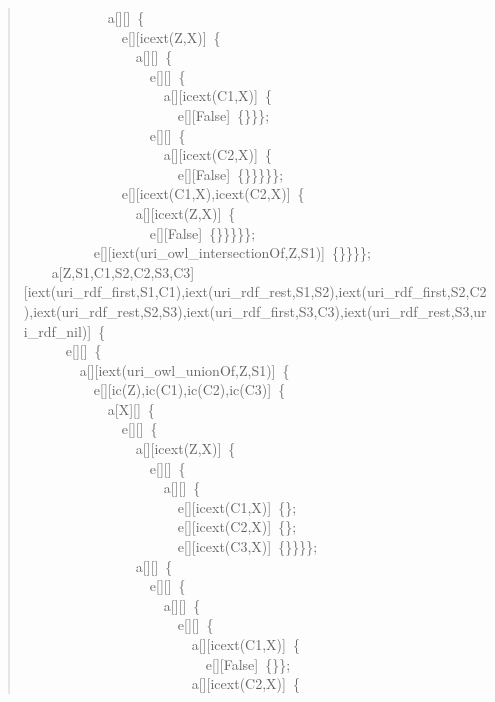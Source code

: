 \begin{quote}
{~~~~~~~~~~~~a[][]~\{\\
~~~~~~~~~~~~~~e[][icext(Z,X)]~\{\\
~~~~~~~~~~~~~~~~a[][]~\{\\
~~~~~~~~~~~~~~~~~~e[][]~\{\\
~~~~~~~~~~~~~~~~~~~~a[][icext(C1,X)]~\{\\
~~~~~~~~~~~~~~~~~~~~~~e[][False]~\{\}\}\};\\
~~~~~~~~~~~~~~~~~~e[][]~\{\\
~~~~~~~~~~~~~~~~~~~~a[][icext(C2,X)]~\{\\
~~~~~~~~~~~~~~~~~~~~~~e[][False]~\{\}\}\}\}\};\\
~~~~~~~~~~~~~~e[][icext(C1,X),icext(C2,X)]~\{\\
~~~~~~~~~~~~~~~~a[][icext(Z,X)]~\{\\
~~~~~~~~~~~~~~~~~~e[][False]~\{\}\}\}\}\};\\
~~~~~~~~~~e[][iext(uri\_owl\_intersectionOf,Z,S1)]~\{\}\}\}\};\\
~~~~a[Z,S1,C1,S2,C2,S3,C3][iext(uri\_rdf\_first,S1,C1),iext(uri\_rdf\_rest,S1,S2),iext(uri\_rdf\_first,S2,C2),iext(uri\_rdf\_rest,S2,S3),iext(uri\_rdf\_first,S3,C3),iext(uri\_rdf\_rest,S3,uri\_rdf\_nil)]~\{\\
~~~~~~e[][]~\{\\
~~~~~~~~a[][iext(uri\_owl\_unionOf,Z,S1)]~\{\\
~~~~~~~~~~e[][ic(Z),ic(C1),ic(C2),ic(C3)]~\{\\
~~~~~~~~~~~~a[X][]~\{\\
~~~~~~~~~~~~~~e[][]~\{\\
~~~~~~~~~~~~~~~~a[][icext(Z,X)]~\{\\
~~~~~~~~~~~~~~~~~~e[][]~\{\\
~~~~~~~~~~~~~~~~~~~~a[][]~\{\\
~~~~~~~~~~~~~~~~~~~~~~e[][icext(C1,X)]~\{\};\\
~~~~~~~~~~~~~~~~~~~~~~e[][icext(C2,X)]~\{\};\\
~~~~~~~~~~~~~~~~~~~~~~e[][icext(C3,X)]~\{\}\}\}\};\\
~~~~~~~~~~~~~~~~a[][]~\{\\
~~~~~~~~~~~~~~~~~~e[][]~\{\\
~~~~~~~~~~~~~~~~~~~~a[][]~\{\\
~~~~~~~~~~~~~~~~~~~~~~e[][]~\{\\
~~~~~~~~~~~~~~~~~~~~~~~~a[][icext(C1,X)]~\{\\
~~~~~~~~~~~~~~~~~~~~~~~~~~e[][False]~\{\}\};\\
~~~~~~~~~~~~~~~~~~~~~~~~a[][icext(C2,X)]~\{\\
}
\end{quote}
